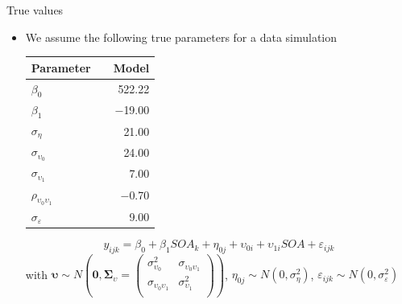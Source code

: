 \documentclass[aspectratio=169]{beamer}
\newcommand{\gvect}[1]{\boldsymbol{#1}}
\newcommand{\gmat}[1]{\boldsymbol{#1}}
\begin{document}
\begin{frame}{True values}
  \begin{itemize}
    \item We assume the following true parameters for a data simulation
    \vspace{.2cm}
  \begin{center}
  \begin{tabular}{lrr}
    \hline
    Parameter && Model \\
    \hline
    $\beta_0$                     && 522.22\\
    $\beta_1$                     && $-$19.00\\
    $\sigma_{\eta}$               && 21.00\\
    $\sigma_{\upsilon_0}$         && 24.00\\
    $\sigma_{\upsilon_1}$         && 7.00\\
    $\rho_{\upsilon_0\upsilon_1}$ && $-$0.70\\
    $\sigma_{\varepsilon}$        && 9.00\\
    \hline
  \end{tabular}
  \end{center}
     \[
       y_{ijk} = \beta_0 + \beta_1 SOA_k + \eta_{0j} + \upsilon_{0i} +
       \upsilon_{1i} SOA + \varepsilon_{ijk} 
  \]
\small
with $\gvect{\upsilon} \sim N\left(\gvect{0}, \gmat{\Sigma}_{\upsilon} = 
    \begin{pmatrix}
      \sigma^2_{\upsilon_0} & \sigma_{\upsilon_0\upsilon_1} \\
      \sigma_{\upsilon_0\upsilon_1} & \sigma^2_{\upsilon_1} \\
    \end{pmatrix}\right)$,
  $\eta_{0j} \sim N(0, \sigma_{\eta}^2)$, $\varepsilon_{ijk} \sim N(0,
  \sigma_{\varepsilon}^2)$ 
  \end{itemize}
\end{frame}

% 
% 
\end{document}
